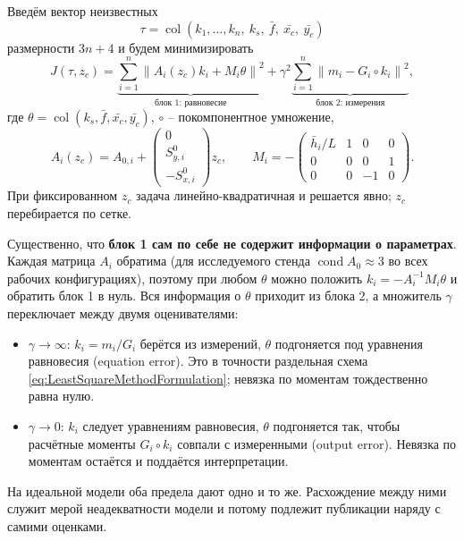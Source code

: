 Введём вектор неизвестных
\begin{equation}
\tau = \operatorname{col}\left(k_1,\ldots,k_n,~k_s,~\bar{f},~\bar{x_c},~\bar{y_c}\right)
\end{equation}
размерности $3n+4$ и будем минимизировать
\begin{equation}
\label{eq:GroupFunctional}
J\left(\tau, z_c\right) =
\underbrace{\sum_{i=1}^{n}\left\|A_i\left(z_c\right)k_i + M_i\theta\right\|^2}_{\text{блок 1: равновесие}}
+ \gamma^2\underbrace{\sum_{i=1}^{n}\left\|m_i - G_i\circ k_i\right\|^2}_{\text{блок 2: измерения}},
\end{equation}
где $\theta = \operatorname{col}\left(k_s,\bar{f},\bar{x_c},\bar{y_c}\right)$, $\circ$ -- покомпонентное умножение,
\begin{equation}
A_i\left(z_c\right) = A_{0,i} + \begin{pmatrix}0 \\ S^0_{y,i} \\ -S^0_{x,i}\end{pmatrix}z_c,
\qquad
M_i = -\begin{pmatrix}
\bar{h}_i/L & 1 & 0 & 0\\
0 & 0 & 0 & 1\\
0 & 0 & -1 & 0
\end{pmatrix}.
\end{equation}
При фиксированном $z_c$ задача линейно-квадратичная и решается явно; $z_c$ перебирается по сетке.

Существенно, что \textbf{блок 1 сам по себе не содержит информации о параметрах}. Каждая матрица $A_i$ обратима (для исследуемого стенда $\operatorname{cond}A_{0} \approx 3$ во всех рабочих конфигурациях), поэтому при любом $\theta$ можно положить $k_i = -A_i^{-1}M_i\theta$ и обратить блок 1 в нуль. Вся информация о $\theta$ приходит из блока 2, а множитель $\gamma$ переключает между двумя оценивателями:
\begin{itemize}
\item $\gamma \to \infty$: $k_i = m_i/G_i$ берётся из измерений, $\theta$ подгоняется под уравнения равновесия (equation error). Это в точности раздельная схема \ref{eq:LeastSquareMethodFormulation}; невязка по моментам тождественно равна нулю.
\item $\gamma \to 0$: $k_i$ следует уравнениям равновесия, $\theta$ подгоняется так, чтобы расчётные моменты $G_i\circ k_i$ совпали с измеренными (output error). Невязка по моментам остаётся и поддаётся интерпретации.
\end{itemize}
На идеальной модели оба предела дают одно и то же. Расхождение между ними служит мерой неадекватности модели и потому подлежит публикации наряду с самими оценками.

